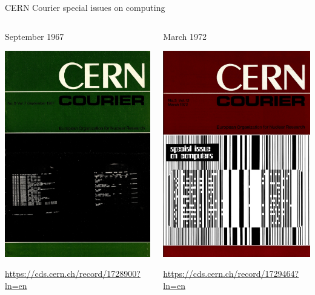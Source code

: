 \documentclass[aspectratio=169]{beamer}
\begin{document}
\begin{frame}{CERN Courier special issues on computing}
\large
\begin{columns}
\begin{center}
September 1967

\vspace{0.2 cm}
\includegraphics[width=0.55\linewidth]{cern-courier-1.png}

\vspace{0.2 cm}
\scriptsize
\textcolor{blue}{\url{https://cds.cern.ch/record/1728900?ln=en}}
\end{center}

\begin{center}
March 1972

\vspace{0.2 cm}
\includegraphics[width=0.55\linewidth]{cern-courier-2.png}

\vspace{0.2 cm}
\scriptsize
\textcolor{blue}{\url{https://cds.cern.ch/record/1729464?ln=en}}
\end{center}
\end{columns}
\end{frame}
\end{document}
